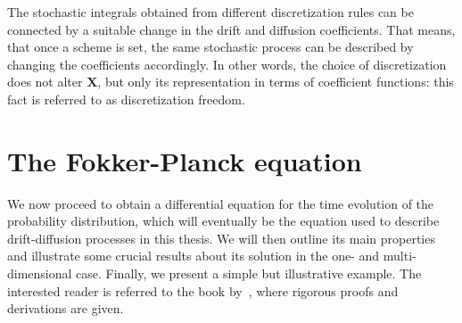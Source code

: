 \documentclass[a4paper,12pt]{book}
\begin{document}
The stochastic integrals obtained from different discretization rules can be connected by a suitable change in the drift and diffusion coefficients. That means, that once a scheme is set, the same stochastic process can be described by changing the coefficients accordingly. In other words, the choice of discretization does not alter $\bm{X}$, but only its representation in terms of coefficient functions: this fact is referred to as discretization freedom.  

\section{The Fokker-Planck equation}
We now proceed to obtain a differential equation for the time evolution of the probability distribution, which will eventually be the equation used to describe drift-diffusion processes in this thesis. We will then outline its main properties and illustrate some crucial results about its solution in the one- and multi-dimensional case. Finally, we present a simple but illustrative example. The interested reader is referred to the book by~\textcite{Risken1996}, where rigorous proofs and derivations are given.
\end{document}
